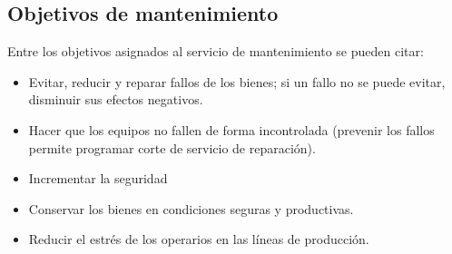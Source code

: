 \documentclass[
	12pt, %
	fleqn, %
	a4paper, %
	oneside, %
]{LegrandOrangeBook}
\begin{document}
\subsection{Objetivos de mantenimiento}
Entre los objetivos asignados al servicio de mantenimiento se pueden citar:
\begin{itemize}
\item Evitar, reducir y reparar fallos de los bienes; si un fallo no se puede evitar, disminuir sus efectos negativos.
\item Hacer que los equipos no fallen de forma incontrolada (prevenir los fallos permite programar corte de servicio de reparación).
\item Incrementar la seguridad
\item Conservar los bienes en condiciones seguras y productivas.
\item Reducir el estrés de los operarios en las líneas de producción.
\end{itemize}
\end{document}
